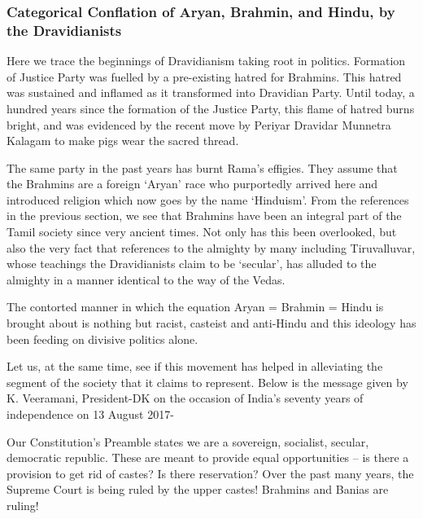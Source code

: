 \subsubsection{Categorical Conflation of Aryan, Brahmin, and Hindu, by the Dravidianists}

Here we trace the beginnings of Dravidianism taking root in politics. Formation of Justice Party was fuelled by a pre-existing hatred for Brahmins. This hatred was sustained and inflamed as it transformed into Dravidian Party. Until today, a hundred years since the formation of the Justice Party, this flame of hatred burns bright, and was evidenced by the recent move by Periyar Dravidar Munnetra Kalagam to make pigs wear the sacred thread.

The same party in the past years has burnt Rama’s effigies. They assume that the Brahmins are a foreign ‘Aryan’ race who purportedly arrived here and introduced religion which now goes by the name ‘Hinduism’. From the references in the previous section, we see that Brahmins have been an integral part of the Tamil society since very ancient times. Not only has this been overlooked, but also the very fact that references to the almighty by many including Tiruvalluvar, whose teachings the Dravidianists claim to be ‘secular’, has alluded to the almighty in a manner identical to the way of the Vedas. 

The contorted manner in which the equation Aryan = Brahmin = Hindu is brought about is nothing but racist, casteist and anti-Hindu and this ideology has been feeding on divisive politics alone.

Let us, at the same time, see if this movement has helped in alleviating the segment of the society that it claims to represent. Below is the message given by K. Veeramani, President-DK on the occasion of India’s seventy years of independence on 13 August 2017-

\begin{myquote}
Our Constitution’s Preamble states we are a sovereign, socialist, secular, democratic republic. These are meant to provide equal opportunities – is there a provision to get rid of castes? Is there reservation? Over the past many years, the Supreme Court is being ruled by the upper castes! Brahmins and Banias are ruling!
\end{myquote}

